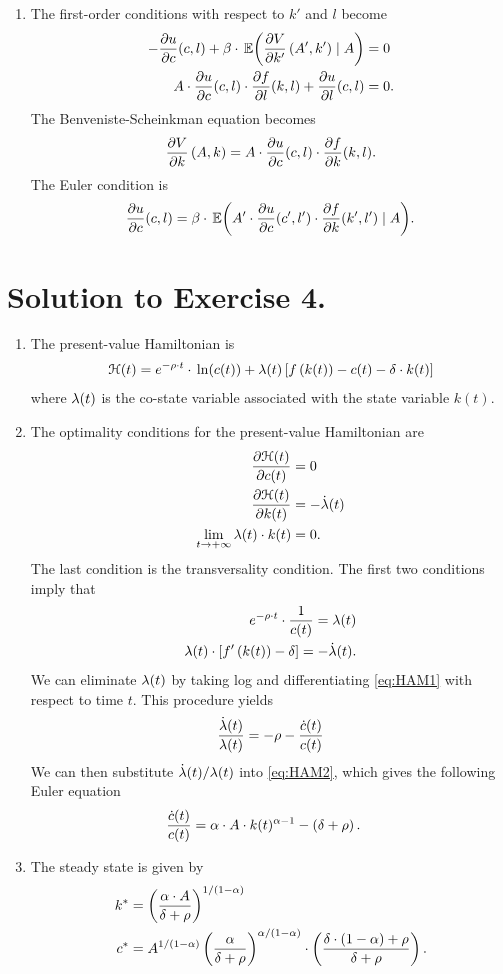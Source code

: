 \documentclass[letterpaper,12pt,leqno]{article}
\begin{document}
\begin{enumerate}
\item The first-order conditions with respect to $k'$ and $l$ become
\begin{align*}
-\pd{u}{c}(c,l)+\b \cdot \E{\pd{V}{k'}\bp{A',k'}\mid A} &=0 \\
A\cdot \pd{u}{c}(c,l)\cdot \pd{f}{l}(k,l)+\pd{u}{l}(c,l)&=0.
\end{align*}
The Benveniste-Scheinkman equation becomes
\begin{align*}
\frac{\partial V}{\partial k}\left( A,k \right)=A\cdot \frac{\partial u}{\partial c}(c,l)\cdot \frac{\partial f}{\partial k}(k,l).
\end{align*}
The Euler condition is
\begin{align*}
\pd{u}{c}(c,l)=\b \cdot \E{A'\cdot \pd{u}{c}(c',l')\cdot \pd{f}{k}(k',l')\mid A}.
\end{align*}
\end{enumerate}

\section*{Solution to Exercise 4.}

\begin{enumerate}
\item The present-value Hamiltonian is
\begin{align*}
\Hc(t)=e^{-\rho\cdot  t}\cdot \ln{c(t)} +\l(t) \bs{f\bp{k(t)} -c(t)-\d\cdot  k(t)}
\end{align*}
where $\lambda(t)$ is the co-state variable associated with the state variable $k(t)$.
\item The optimality conditions for the present-value Hamiltonian are
\begin{align*}
\frac{\partial \mathcal{H}(t)}{\partial c(t)} &=0\\
\frac{\partial \mathcal{H}(t)}{\partial k(t)} &=-\dot{\lambda}(t)\\
\lim_{t\to+\infty}\lambda(t)\cdot k(t)&=0.
\end{align*}
The last condition is the transversality condition. The first two conditions imply that 
\begin{align}
e^{-\rho \cdot t}\cdot \frac{1}{c(t)} =\lambda(t)\label{eq:HAM1} \\
\lambda(t)\cdot  \left[ f'\left( k(t) \right) -\delta \right] =-\dot{\lambda}(t).\label{eq:HAM2}
\end{align}
We can eliminate $\lambda(t)$ by taking log and differentiating \eqref{eq:HAM1} with respect to time $t$. This procedure yields
\begin{align*}
\frac{\dot{\lambda}(t)}{\lambda(t)}=-\rho -\frac{\dot{c}(t)}{c(t)}
\end{align*}
We can then substitute $\dot{\lambda}(t)/\lambda(t)$ into \eqref{eq:HAM2}, which gives the following Euler equation
\begin{align*}
\frac{\dot{c}(t)}{c(t)} &=\alpha\cdot A\cdot k(t)^{\alpha -1}-\left( \delta +\rho \right) .
\end{align*}
\item The steady state is given by
\begin{align*}
k^*&=\left( \frac{\alpha\cdot A}{\delta +\rho} \right) ^{1/\left( 1-\alpha \right)}\\
c^*&=A^{1/\left( 1-\alpha \right)}\left( \frac{\alpha}{\delta +\rho} \right)^{\alpha /\left( 1-\alpha \right)}\cdot \left( \frac{\delta \cdot \left( 1-\alpha \right) +\rho}{\delta +\rho} \right).
\end{align*}
\end{enumerate}
\end{document}
